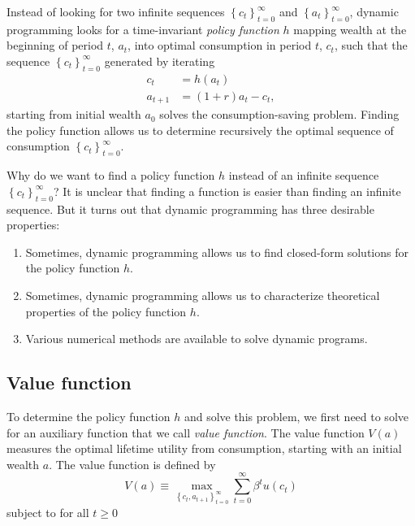 \documentclass{article}
\begin{document}
Instead of looking for two infinite sequences $\left\lbrace c_t\right\rbrace _{t=0}^{\infty}$ and $\left\lbrace a_t\right\rbrace _{t=0}^{\infty}$, dynamic programming looks for a time-invariant \textit{policy function} $h$ mapping wealth at the beginning of period $t$, $a_t$, into optimal consumption in period $t$, $c_t$, such that the sequence $\left\lbrace c_t\right\rbrace _{t=0}^{\infty}$ generated by iterating
\wcSpan*[id=equation-4]{}
\setcounter{tpequation}{3}\label{e:iter1}
\setcounter{tpequation}{4}\label{e:iter2}
\[
\begin{align*}
c_t&=h(a_t)\tag{4}\\
a_{t+1}&=(1+r) a_t-c_t,\tag{5}
\end{align*}
\]
starting from initial wealth $a_0$ solves the consumption-saving problem. Finding the policy function allows us to determine recursively the optimal sequence of consumption $\left\lbrace c_t\right\rbrace _{t=0}^{\infty}$.

Why do we want to find a policy function $h$ instead of an infinite sequence $\left\lbrace c_t\right\rbrace _{t=0}^{\infty}$? It is unclear that finding a function is easier than finding an infinite sequence. But it turns out that dynamic programming has three desirable properties:
\begin{enumerate}
\item Sometimes, dynamic programming allows us to find closed-form solutions for the policy function $h$.
\item Sometimes, dynamic programming allows us to characterize theoretical properties of the policy function $h$.
\item Various numerical methods are available to solve dynamic programs.
\end{enumerate}

\subsection{Value function}

To determine the policy function $h$ and solve this problem, we first need to solve for an auxiliary function that we call \textit{value function}. The value function $V(a)$ measures the optimal lifetime utility from consumption, starting with an initial wealth $a$. The value function is defined by
\wcSpan*[id=equation-6]{}
\setcounter{tpequation}{5}\label{e:value}
\[
V(a)\equiv \max_{\left\lbrace c_t,a_{t+1}\right\rbrace _{t=0}^{\infty}} \sum_{t=0}^{\infty}\beta^t u(c_t)\tag{6}
\]
subject to for all $t\ge 0$
\end{document}
